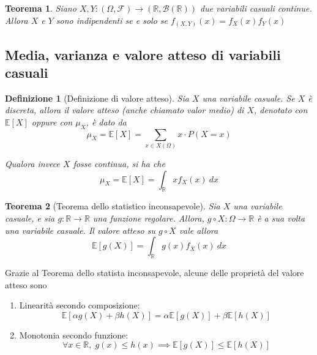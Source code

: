\documentclass{article}
\newtheorem{theorem}{Teorema}
\newtheorem{definition}{Definizione}
\begin{document}
                \vspace{10pt}
                \begin{theorem}
                    Siano $X, Y: (\Omega, \mathcal{F}) \rightarrow (\mathbb{R}, \mathcal{B}(\mathbb{R}))$ due variabili casuali continue.
                    Allora $X$ e $Y$ sono indipendenti se e solo se $f_{(X, Y)}(x) = f_{X}(x)f_{Y}(x)$
                \end{theorem}

        \vspace{10pt}
        \subsection{Media, varianza e valore atteso di variabili casuali}
            \begin{definition}[Definizione di valore atteso]
                Sia $X$ una variabile casuale.
                Se $X$ è discreta, allora il valore atteso (anche chiamato valor medio) di $X$, denotato con $\mathbb{E}[X]$ oppure con $\mu_{X}$, è dato da
                \[
                    \mu_{X} = \mathbb{E}[X] = \sum_{x \in X(\Omega)} x \cdot P(X = x)
                \]

                Qualora invece $X$ fosse continua, si ha che
                \[
                    \mu_{X} = \mathbb{E}[X] = \int_{\mathbb{R}} x f_{X}(x) \: dx
                \]
            \end{definition}

            \begin{theorem}[Teorema dello statistico inconsapevole]
                Sia $X$ una variabile casuale, e sia $g: \mathbb{R} \rightarrow \mathbb{R}$ una funzione regolare. 
                Allora, $g \circ X: \Omega \rightarrow \mathbb{R}$ è a sua volta una variabile casuale.
                Il valore atteso su $g \circ X$ vale allora
                \[
                    \mathbb{E}[g(X)] = \int_{\mathbb{R}} g(x) f_{X}(x) \: dx
                \]
            \end{theorem}

            Grazie al Teorema dello statista inconsapevole, alcune delle proprietà del valore atteso sono
            \begin{enumerate}
                \item Linearità secondo composizione:
                \[
                    \mathbb{E}[\alpha g(X) + \beta h(X)] = \alpha \mathbb{E}[g(X)] + \beta \mathbb{E}[h(X)]
                \]

                \item Monotonia secondo funzione:
                \[
                    \forall x \in \mathbb{R}, \; g(x) \leq h(x) \implies \mathbb{E}[g(X)] \leq \mathbb{E}[h(X)]
                \]
            \end{enumerate}
\end{document}
